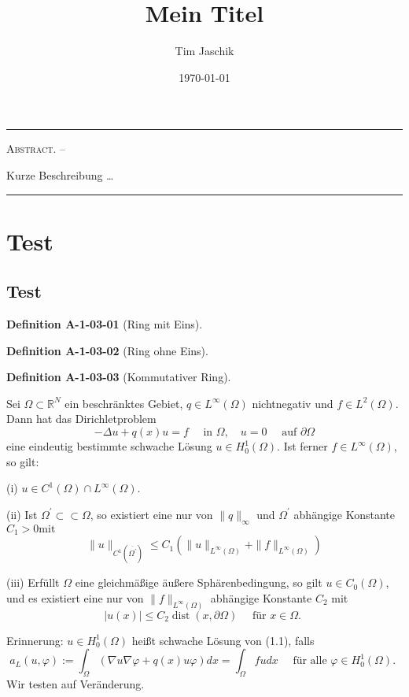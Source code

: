 \documentclass[10pt, letterpaper]{article}
\title{Mein Titel}
\author{Tim Jaschik}
\date{\today}
\renewenvironment{abstract}
  {
    \begin{adjustwidth}{1.5cm}{1.5cm}
    \small
    \textsc{Abstract. –}%
  }
  {
    \end{adjustwidth}
  }
\newcommand{\CustomHeading}[3]{%
  \par\medskip\noindent%
  \textbf{#1 #2} \textnormal{(#3)}.\enskip%
}
\newenvironment{DEF}[2]{\CustomHeading{Definition}{#1}{#2}}{}
\begin{document}
\maketitle
\rule{\textwidth}{0.5pt}
\begin{abstract}
Kurze Beschreibung …
\end{abstract}
\rule{\textwidth}{0.5pt}
\vspace{0.5cm}

\tableofcontents

\pagebreak

\section{Test}

\subsection{Test}


\begin{DEF}{A-1-03-01}{Ring mit Eins}
\end{DEF}


\begin{DEF}{A-1-03-02}{Ring ohne Eins}
\end{DEF}


\begin{DEF}{A-1-03-03}{Kommutativer Ring}
Sei $\Omega \subset \mathbb{R}^{N}$ ein beschränktes Gebiet, $q \in L^{\infty}(\Omega)$ nichtnegativ und $f \in L^{2}(\Omega)$. Dann hat das Dirichletproblem
$$
-\Delta u+q(x) u=f \quad \text { in } \Omega, \quad u=0 \quad \text { auf } \partial \Omega
$$
eine eindeutig bestimmte schwache Lösung $u \in H_{0}^{1}(\Omega)$. Ist ferner $f \in L^{\infty}(\Omega)$, so gilt:

(i) $u \in C^{1}(\Omega) \cap L^{\infty}(\Omega)$.

(ii) Ist $\Omega^{\prime} \subset \subset \Omega$, so existiert eine nur von $\|q\|_{\infty}$ und $\Omega^{\prime}$ abhängige Konstante $C_{1}>0 \mathrm{mit}$
$$
\|u\|_{C^{1}\left(\overline{\Omega^{\prime}}\right)} \leq C_{1}\left(\|u\|_{L^{\infty}(\Omega)}+\|f\|_{L^{\infty}(\Omega)}\right)
$$

(iii) Erfüllt $\Omega$ eine gleichmäßige äußere Sphärenbedingung, so gilt $u \in C_{0}(\Omega)$, und es existiert eine nur von $\|f\|_{L^{\infty}(\Omega)}$ abhängige Konstante $C_{2}$ mit
$$
|u(x)| \leq C_{2} \operatorname{dist}(x, \partial \Omega) \quad \text { für } x \in \Omega \text {. }
$$

Erinnerung: $u \in H_{0}^{1}(\Omega)$ heißt schwache Lösung von (1.1), falls
$$
a_{L}(u, \varphi):=\int_{\Omega}(\nabla u \nabla \varphi+q(x) u \varphi) d x=\int_{\Omega} f u d x \quad \text { für alle } \varphi \in H_{0}^{1}(\Omega) \text {. }
$$
Wir testen auf Veränderung.
\end{DEF}
\end{document}
